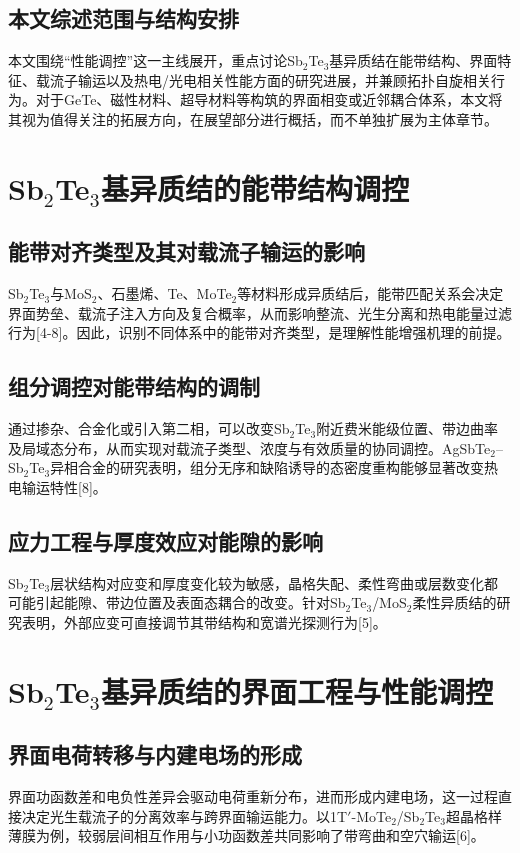 \documentclass[12pt,a4paper]{ctexart}
\begin{document}
\subsection{本文综述范围与结构安排}
本文围绕“性能调控”这一主线展开，重点讨论Sb$_2$Te$_3$基异质结在能带结构、界面特征、载流子输运以及热电/光电相关性能方面的研究进展，并兼顾拓扑自旋相关行为。对于GeTe、磁性材料、超导材料等构筑的界面相变或近邻耦合体系，本文将其视为值得关注的拓展方向，在展望部分进行概括，而不单独扩展为主体章节。

\section{\texorpdfstring{Sb$_2$Te$_3$}{Sb2Te3}基异质结的能带结构调控}

\subsection{能带对齐类型及其对载流子输运的影响}
Sb$_2$Te$_3$与MoS$_2$、石墨烯、Te、MoTe$_2$等材料形成异质结后，能带匹配关系会决定界面势垒、载流子注入方向及复合概率，从而影响整流、光生分离和热电能量过滤行为[4-8]。因此，识别不同体系中的能带对齐类型，是理解性能增强机理的前提。

\subsection{组分调控对能带结构的调制}
通过掺杂、合金化或引入第二相，可以改变Sb$_2$Te$_3$附近费米能级位置、带边曲率及局域态分布，从而实现对载流子类型、浓度与有效质量的协同调控。AgSbTe$_2$--Sb$_2$Te$_3$异相合金的研究表明，组分无序和缺陷诱导的态密度重构能够显著改变热电输运特性[8]。

\subsection{应力工程与厚度效应对能隙的影响}
Sb$_2$Te$_3$层状结构对应变和厚度变化较为敏感，晶格失配、柔性弯曲或层数变化都可能引起能隙、带边位置及表面态耦合的改变。针对Sb$_2$Te$_3$/MoS$_2$柔性异质结的研究表明，外部应变可直接调节其带结构和宽谱光探测行为[5]。

\section{\texorpdfstring{Sb$_2$Te$_3$}{Sb2Te3}基异质结的界面工程与性能调控}

\subsection{界面电荷转移与内建电场的形成}
界面功函数差和电负性差异会驱动电荷重新分布，进而形成内建电场，这一过程直接决定光生载流子的分离效率与跨界面输运能力。以1T$'$-MoTe$_2$/Sb$_2$Te$_3$超晶格样薄膜为例，较弱层间相互作用与小功函数差共同影响了带弯曲和空穴输运[6]。
\end{document}
